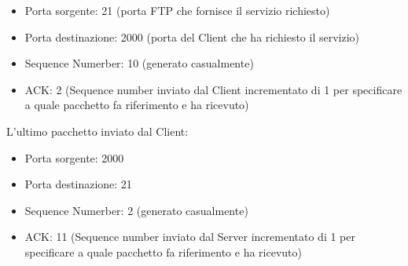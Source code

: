 \documentclass[10pt]{article}
\begin{document}
\begin{enumerate}
\begin{itemize}
			\item Porta sorgente: 21 (porta FTP che fornisce il servizio richiesto)
			\item Porta destinazione: 2000 (porta del Client che ha richiesto il servizio)
			\item Sequence Numerber: 10 (generato casualmente)
			\item ACK: 2 (Sequence number inviato dal Client incrementato di 1 per specificare a quale pacchetto fa riferimento e ha ricevuto)
		\end{itemize}
		L'ultimo pacchetto inviato dal Client:
		\begin{itemize}
			\item Porta sorgente: 2000 
			\item Porta destinazione: 21 
			\item Sequence Numerber: 2 (generato casualmente)
			\item ACK: 11 (Sequence number inviato dal Server incrementato di 1 per specificare a quale pacchetto fa riferimento e ha ricevuto)
		\end{itemize}
	\end{enumerate}
\end{document}
